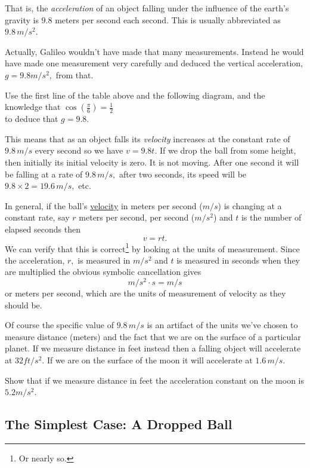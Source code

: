 That is, the \emph{acceleration} of an object falling under the
influence of the earth's gravity is $9.8$ meters per second each
second. This is usually abbreviated as $9.8\,m/s^2.$ 
\begin{embeddedproblem}{}
  Actually, Galileo wouldn't have made that many measurements. Instead
  he would have made one measurement very carefully and deduced the
  vertical acceleration, $g=9.8 m/s^2,$  from that. 

  Use the first line of the table above and the following diagram, and
  the knowledge that $\cos\left(\frac{\pi}{6}\right)=\frac12$\\ 
\InsertGraphic{}
  to deduce that $g=9.8.$
\end{embeddedproblem}
This means that as an object falls its \emph{velocity} increases at the
constant rate of \(9.8\, m/s\) every second so we have $v=9.8t.$ If we
drop the ball from some height, then initially its initial velocity is
zero. It is not moving. After one second it will be falling at a rate
of \(9.8\,m/s,\) after two seconds, its speed will be
\(9.8\times2=19.6\,m/s,\) etc.

In general, if the ball's \underline{velocity} in meters per second
($m/s$) is changing at a constant rate, say $r$ meters per second, per
second ($m/s^2$) and $t$ is the number of elapsed seconds then
$$
v=rt.
$$
We can verify that this is correct\footnote{Or nearly so.} by looking
at the  units of measurement. Since the acceleration, $r,$ is measured
in $m/s^2$ and $t$ is measured in seconds when they are multiplied the
obvious symbolic cancellation gives
$$
m/s^2\cdot s = m/s
$$
or meters per second, which are the units of measurement of velocity
as they should be.

Of course the specific value of $9.8\,m/s$  is an artifact of the units
we've chosen to measure distance (meters) and the fact that we are on
the surface of a particular planet. If we measure distance in feet
instead then a falling object will accelerate at $32 ft/s^2.$ If we
are on the surface of the moon it will accelerate at $1.6\, m/s.$

\begin{embeddedproblem}{}
  Show that if we measure distance in feet the acceleration constant
  on the moon is $5.2 m/s^2.$
\end{embeddedproblem}


\subsection{The Simplest Case: A Dropped Ball}
\label{subsec:simpl-case:-dropp}

